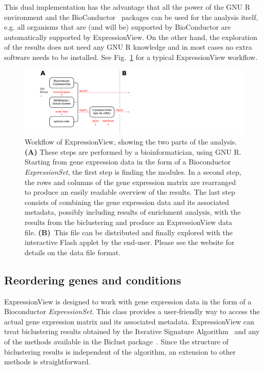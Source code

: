 \documentclass[round]{bioinfo}
\begin{document}
This dual implementation has the advantage that all the power of the
GNU R environment and the BioConductor~\citep{gentleman04} packages
can be used for the analysis itself, e.g. all organisms that are (and
will be) supported by BioConductor are automatically supported by
ExpressionView. On the other hand, the exploration of the results does
not need any GNU R knowledge and in most cases no extra software needs to
be installed. See Fig.~\ref{fig:workflow} for a typical
ExpressionView workflow.

\begin{figure}
\centering
\includegraphics[width=0.7\linewidth]{fig1}
\caption{
  Workflow of ExpressionView, showing the two parts of the analysis.
  \textbf{(A)} These steps are performed by a bioinformatician,
  using GNU R. Starting from gene expression data in the form of a
  Bioconductor \textit{ExpressionSet}, the first step is finding the
  modules. In a second step, the rows and columns of the gene
  expression matrix are rearranged to produce an easily readable
  overview of the results. The last step consists of combining the
  gene expression data and its associated metadata, possibly including
  results of enrichment analysis, with the results
  from the biclustering and produce an ExpressionView data file.
  \textbf{(B)}~This file can be distributed and finally explored with
  the interactive Flash applet by the end-user. Please see the
  website for details on the data file format.}
\label{fig:workflow}
\end{figure}

\vspace*{-9pt}
\subsection{Reordering genes and conditions}

ExpressionView is designed to work with gene expression data in the
form of a Bioconductor \textit{ExpressionSet}. This class provides a
user-friendly way to access the actual gene expression matrix and its
associated metadata. ExpressionView can treat biclustering results obtained by the 
Iterative Signature Algorithm~\citep{bergmann03,csardi10} and any of 
the methods available in the Biclust package~\citep{kaiser08}. Since 
the structure of biclustering results is independent of the algorithm, 
an extension to other methods is straightforward.
\end{document}
